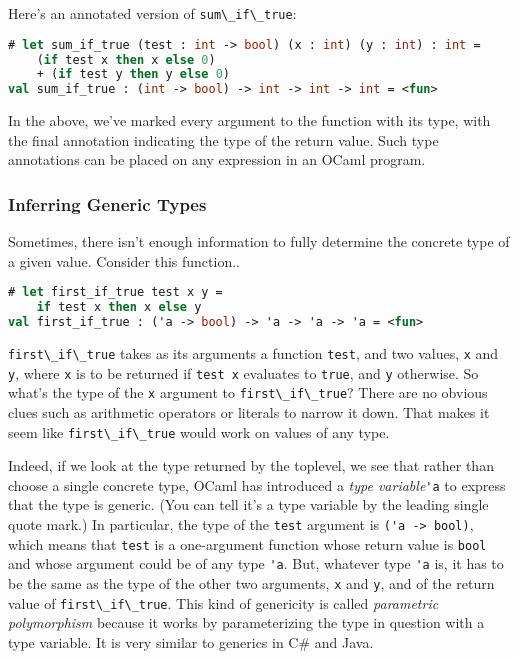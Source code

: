 Here's an annotated version of \passthrough{\lstinline!sum\_if\_true!}:

\begin{lstlisting}[language=Caml]
# let sum_if_true (test : int -> bool) (x : int) (y : int) : int =
    (if test x then x else 0)
    + (if test y then y else 0)
val sum_if_true : (int -> bool) -> int -> int -> int = <fun>
\end{lstlisting}

In the above, we've marked every argument to the function with its type,
with the final annotation indicating the type of the return value. Such
type annotations can be placed on any expression in an OCaml program.

\hypertarget{inferring-generic-types}{%
\subsubsection{Inferring Generic Types}\label{inferring-generic-types}}

Sometimes, there isn't enough information to fully determine the
concrete type of a given value. Consider this
function..

\begin{lstlisting}[language=Caml]
# let first_if_true test x y =
    if test x then x else y
val first_if_true : ('a -> bool) -> 'a -> 'a -> 'a = <fun>
\end{lstlisting}

\passthrough{\lstinline!first\_if\_true!} takes as its arguments a
function \passthrough{\lstinline!test!}, and two values,
\passthrough{\lstinline!x!} and \passthrough{\lstinline!y!}, where
\passthrough{\lstinline!x!} is to be returned if
\passthrough{\lstinline!test x!} evaluates to
\passthrough{\lstinline!true!}, and \passthrough{\lstinline!y!}
otherwise. So what's the type of the \passthrough{\lstinline!x!}
argument to \passthrough{\lstinline!first\_if\_true!}? There are no
obvious clues such as arithmetic operators or literals to narrow it
down. That makes it seem like \passthrough{\lstinline!first\_if\_true!}
would work on values of any type.

Indeed, if we look at the type returned by the toplevel, we see that
rather than choose a single concrete type, OCaml has introduced a
\emph{type variable}\passthrough{\lstinline!'a!} to express that the
type is generic. (You can tell it's a type variable by the leading
single quote mark.) In particular, the type of the
\passthrough{\lstinline!test!} argument is
\passthrough{\lstinline!('a -> bool)!}, which means that
\passthrough{\lstinline!test!} is a one-argument function whose return
value is \passthrough{\lstinline!bool!} and whose argument could be of
any type \passthrough{\lstinline!'a!}. But, whatever type
\passthrough{\lstinline!'a!} is, it has to be the same as the type of
the other two arguments, \passthrough{\lstinline!x!} and
\passthrough{\lstinline!y!}, and of the return value of
\passthrough{\lstinline!first\_if\_true!}. This kind of genericity is
called \emph{parametric polymorphism} because it works by parameterizing
the type in question with a type variable. It is very similar to
generics in C\# and Java. 

